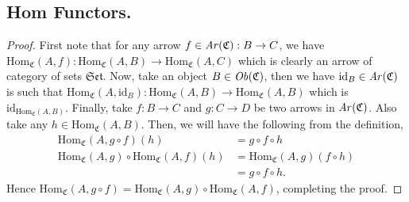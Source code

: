 \documentclass{article}
\theoremstyle{definition}
\theoremstyle{remark}
\theoremstyle{definition}
\theoremstyle{definition}
\theoremstyle{definition}
\newcommand{\cat}[1]{\mathfrak{#1}}
\newcommand{\obj}[1]{\text{\textit{Ob}}(#1)}
\newcommand{\arr}[1]{\text{\textit{Ar}}(#1)}
\newcommand{\Id}[1]{\text{id}_{#1}}
\newcommand{\homset}[3]{\text{Hom}_{#1}(#2,#3)}
\begin{document}
\subsection{Hom Functors.}
\label{PROOF-1}\begin{proof}
	First note that for any arrow $ f\in \arr{\cat{C}} : B\to C$, we have $ \homset{\cat{C}}{A}{f} : \homset{\cat{C}}{A}{B} \to \homset{\cat{C}}{A}{C} $ which is clearly an arrow of category of sets $ \cat{Set} $. Now, take an object $ B\in  \obj{\cat{C}}$, then we have $ \Id{B} \in\arr{\cat{C}} $ is such that $ \homset{\cat{C}}{A}{\Id{B}} : \homset{\cat{C}}{A}{B} \to \homset{\cat{C}}{A}{B} $ which is $ \Id{\homset{\cat{C}}{A}{B}} $. Finally, take $ f:B\to C $ and $ g:C\to D $ be two arrows in $ \arr{\cat{C}} $. Also take any $ h\in \homset{\cat{C}}{A}{B} $. Then, we will have the following from the definition,
	\begin{equation*}
		\begin{split}
			\homset{\cat{C}}{A}{g\circ f}(h) &= g \circ f\circ h\\
			\homset{\cat{C}}{A}{g} \circ \homset{\cat{C}}{A}{f} (h) &= \homset{\cat{C}}{A}{g} (f\circ h)\\
			&= g\circ f\circ h.
		\end{split}
	\end{equation*}
	Hence $ \homset{\cat{C}}{A}{g\circ f} = \homset{\cat{C}}{A}{g}\circ \homset{\cat{C}}{A}{f} $, completing the proof.
\end{proof}
\end{document}
